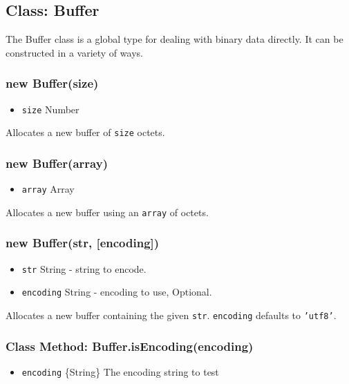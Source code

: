 \subsection{Class: Buffer}

The Buffer class is a global type for dealing with binary data directly.
It can be constructed in a variety of ways.

\subsubsection{new Buffer(size)}

\begin{itemize}
\item
  \texttt{size} Number
\end{itemize}

Allocates a new buffer of \texttt{size} octets.

\subsubsection{new Buffer(array)}

\begin{itemize}
\item
  \texttt{array} Array
\end{itemize}

Allocates a new buffer using an \texttt{array} of octets.

\subsubsection{new Buffer(str, {[}encoding{]})}

\begin{itemize}
\item
  \texttt{str} String - string to encode.
\item
  \texttt{encoding} String - encoding to use, Optional.
\end{itemize}

Allocates a new buffer containing the given \texttt{str}.
\texttt{encoding} defaults to \texttt{'utf8'}.

\subsubsection{Class Method: Buffer.isEncoding(encoding)}

\begin{itemize}
\item
  \texttt{encoding} \{String\} The encoding string to test
\end{itemize}

